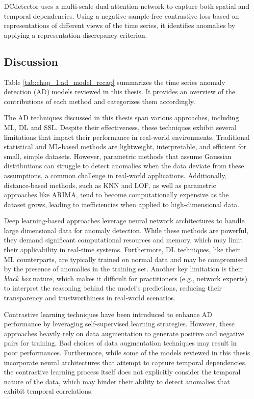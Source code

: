 DCdetector \cite{yang2023dcdetector} uses a multi-scale dual attention network to capture both spatial and temporal dependencies. Using a negative-sample-free contrastive loss based on representations of different views of the time series, it identifies anomalies by applying a representation discrepancy criterion.


\subsection{Discussion}

Table \ref{tab:chap_1:ad_model_recap} summarizes the time series anomaly detection (AD) models reviewed in this thesis. It provides an overview of the contributions of each method and categorizes them accordingly.

The AD techniques discussed in this thesis span various approaches, including ML, DL and SSL. Despite their effectiveness, these techniques exhibit several limitations that impact their performance in real-world environments. Traditional statistical and ML-based methods are lightweight, interpretable, and efficient for small, simple datasets. However, parametric methods that assume Gaussian distributions can struggle to detect anomalies when the data deviate from these assumptions, a common challenge in real-world applications. Additionally, distance-based methods, such as KNN and LOF, as well as parametric approaches like ARIMA, tend to become computationally expensive as the dataset grows, leading to inefficiencies when applied to high-dimensional data.

Deep learning-based approaches leverage neural network architectures to handle large dimensional data for anomaly detection. While these methods are powerful, they demand significant computational resources and memory, which may limit their applicability in real-time systems. Furthermore, DL techniques, like their ML counterparts, are typically trained on normal data and may be compromised by the presence of anomalies in the training set. Another key limitation is their \textit{black box} nature, which makes it difficult for practitioners (e.g., network experts) to interpret the reasoning behind the model's predictions, reducing their transparency and trustworthiness in real-world scenarios.

Contrastive learning techniques have been introduced to enhance AD performance by leveraging self-supervised learning strategies. However, these approaches heavily rely on data augmentation to generate positive and negative pairs for training. Bad choices of data augmentation techniques may result in poor performances. Furthermore, while some of the models reviewed in this thesis incorporate neural architectures that attempt to capture temporal dependencies, the contrastive learning process itself does not explicitly consider the temporal nature of the data, which may hinder their ability to detect anomalies that exhibit temporal correlations.

